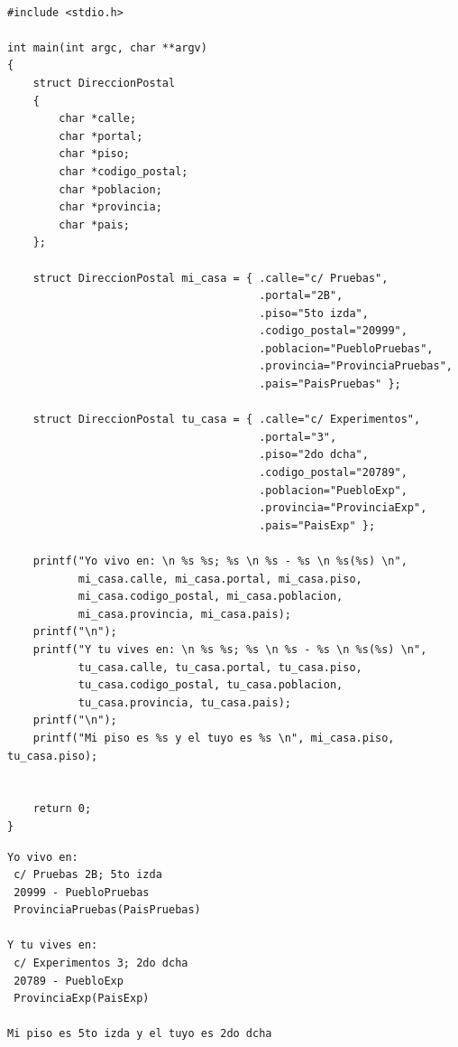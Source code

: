 \documentclass[spanish,12pt,a4paper,final,oneside]{book}
\begin{document}
\begin{lstlisting}[frame=single, caption=lenguaje C]

#include <stdio.h>

int main(int argc, char **argv)
{
    struct DireccionPostal 
    {
        char *calle;
        char *portal;
        char *piso;
        char *codigo_postal;
        char *poblacion;
        char *provincia;
        char *pais;
    };
    
    struct DireccionPostal mi_casa = { .calle="c/ Pruebas",
                                       .portal="2B",
                                       .piso="5to izda",
                                       .codigo_postal="20999",
                                       .poblacion="PuebloPruebas",
                                       .provincia="ProvinciaPruebas",
                                       .pais="PaisPruebas" };
                              
    struct DireccionPostal tu_casa = { .calle="c/ Experimentos",
                                       .portal="3",
                                       .piso="2do dcha",
                                       .codigo_postal="20789",
                                       .poblacion="PuebloExp",
                                       .provincia="ProvinciaExp",
                                       .pais="PaisExp" };
                              
    printf("Yo vivo en: \n %s %s; %s \n %s - %s \n %s(%s) \n",
           mi_casa.calle, mi_casa.portal, mi_casa.piso,
           mi_casa.codigo_postal, mi_casa.poblacion,
           mi_casa.provincia, mi_casa.pais);
    printf("\n"); 
    printf("Y tu vives en: \n %s %s; %s \n %s - %s \n %s(%s) \n",
           tu_casa.calle, tu_casa.portal, tu_casa.piso,
           tu_casa.codigo_postal, tu_casa.poblacion,
           tu_casa.provincia, tu_casa.pais);
    printf("\n"); 
    printf("Mi piso es %s y el tuyo es %s \n", mi_casa.piso, tu_casa.piso);  
    
	
    return 0;
}
\end{lstlisting}
\begin{lstlisting}[frame=single]
Yo vivo en:
 c/ Pruebas 2B; 5to izda
 20999 - PuebloPruebas
 ProvinciaPruebas(PaisPruebas)

Y tu vives en:
 c/ Experimentos 3; 2do dcha
 20789 - PuebloExp
 ProvinciaExp(PaisExp)

Mi piso es 5to izda y el tuyo es 2do dcha
\end{lstlisting}
\end{document}
